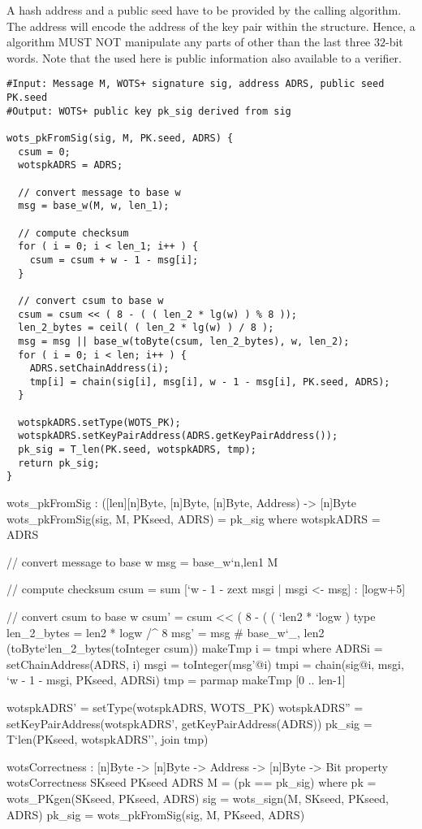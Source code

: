 A \wotsp hash address \adrs and a public seed \pseed have to be provided by the
calling algorithm. The address will encode the address of the \wotsp key
pair within the \spx structure. Hence, a \wotsp algorithm MUST NOT
manipulate any parts of \adrs other than the last three $32$-bit words.
Note that the \pseed used here is public information also available to
a verifier.

\begin{lstlisting}[label=alg:wots_pkfromsig, language=pseudoc,
                   caption=\texttt{wots\_pkFromSig} -- Computing a WOTS+ public key from a
                           message and its signature.]
#Input: Message M, WOTS+ signature sig, address ADRS, public seed PK.seed
#Output: WOTS+ public key pk_sig derived from sig

wots_pkFromSig(sig, M, PK.seed, ADRS) {
  csum = 0;
  wotspkADRS = ADRS;

  // convert message to base w
  msg = base_w(M, w, len_1);

  // compute checksum
  for ( i = 0; i < len_1; i++ ) {
    csum = csum + w - 1 - msg[i];
  }

  // convert csum to base w
  csum = csum << ( 8 - ( ( len_2 * lg(w) ) % 8 ));
  len_2_bytes = ceil( ( len_2 * lg(w) ) / 8 );
  msg = msg || base_w(toByte(csum, len_2_bytes), w, len_2);
  for ( i = 0; i < len; i++ ) {
    ADRS.setChainAddress(i);
    tmp[i] = chain(sig[i], msg[i], w - 1 - msg[i], PK.seed, ADRS);
  }

  wotspkADRS.setType(WOTS_PK);
  wotspkADRS.setKeyPairAddress(ADRS.getKeyPairAddress());
  pk_sig = T_len(PK.seed, wotspkADRS, tmp);
  return pk_sig;
}
\end{lstlisting}

\begin{code}
  wots_pkFromSig : ([len][n]Byte, [n]Byte, [n]Byte, Address) -> [n]Byte
  wots_pkFromSig(sig, M, PKseed, ADRS) = pk_sig where
    wotspkADRS = ADRS

    // convert message to base w
    msg = base_w`{n,len1} M

    // compute checksum
    csum = sum [`w - 1 - zext msgi | msgi <- msg] : [logw+5]

    // convert csum to base w
    csum' = csum << ( 8 - ( ( `len2 * `logw ) %
    type len_2_bytes = len2 * logw /^ 8
    msg' = msg # base_w`{_, len2} (toByte`{len_2_bytes}(toInteger csum))
    makeTmp i = tmpi where
      ADRSi = setChainAddress(ADRS, i)
      msgi = toInteger(msg'@i)
      tmpi = chain(sig@i, msgi, `w - 1 - msgi, PKseed, ADRSi)
    tmp = parmap makeTmp [0 .. len-1]

    wotspkADRS' = setType(wotspkADRS, WOTS_PK)
    wotspkADRS'' = setKeyPairAddress(wotspkADRS', getKeyPairAddress(ADRS))
    pk_sig = T`{len}(PKseed, wotspkADRS'', join tmp)

  wotsCorrectness : [n]Byte -> [n]Byte -> Address -> [n]Byte -> Bit
  property wotsCorrectness SKseed PKseed ADRS M = (pk == pk_sig) where
    pk = wots_PKgen(SKseed, PKseed, ADRS)
    sig = wots_sign(M, SKseed, PKseed, ADRS)
    pk_sig = wots_pkFromSig(sig, M, PKseed, ADRS)
\end{code}

